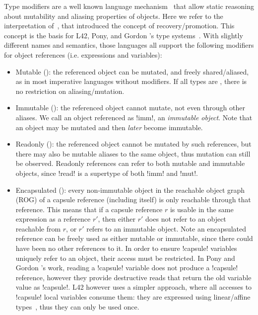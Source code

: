Type modifiers
 are a well known language mechanism~\cite{TschantzErnst05,BirkaErnst04,OstlundEtAl08,clebsch2015deny,GianniniEtAl16,GordonEtAl12}
 that allow static reasoning about mutability and aliasing properties of objects. Here we refer to the interpretation of~\cite{GordonEtAl12}, that introduced the concept of recovery/promotion. This concept is the basis for L42, Pony, and Gordon \etal's type systems~\cite{GordonEtAl12,ServettoEtAl13a,ServettoZucca15,ServettoEtAl13a,clebsch2015deny,clebsch2017orca}. With slightly different names and semantics, those languages all support the following modifiers for object references (i.e. expressions and variables):
\begin{itemize}
\item Mutable (\Q@mut@): the referenced object can be mutated, and freely shared/aliased, as in most imperative languages without modifiers.
If all types are \Q@mut@, there is no restriction on aliasing/mutation.
\item Immutable (\Q@imm@): the referenced object cannot mutate, not even through other aliases. We call an object referenced as \Q!imm!, an \emph{immutable object}. Note that an object may be mutated and then \emph{later} become immutable.
\item Readonly (\Q@read@): the referenced object cannot be mutated by such references, but there may also be mutable aliases to the same object, thus mutation can still be observed. Readonly references can refer to both mutable and immutable objects, since \Q!read! is a supertype of both \Q!imm! and \Q!mut!.
\item Encapsulated (\Q@capsule@):
every non-immutable object in the reachable object graph (ROG) of a capsule reference (including itself) is only reachable through that reference. This means that if a capsule reference $r$ is usable in the same expression as a reference $r'$, then either $r'$ does not refer to an object reachable from $r$, or $r'$ refers to an immutable object. Note an encapsulated reference can be freely used as either mutable or immutable, since there could have been no other references to it.
 In order to ensure \Q!capsule! variables uniquely refer to an object, their access must be restricted. In Pony and Gordon \etal's work, reading a \Q!capsule! variable does not produce a \Q!capsule! reference, however they provide destructive reads that return the old variable value as \Q!capsule!. L42 however uses a simpler approach, where all accesses to \Q!capsule! local variables consume them: they are expressed using linear/affine types~\cite{boyland2001alias}, thus they can only be used once. 
\end{itemize}


